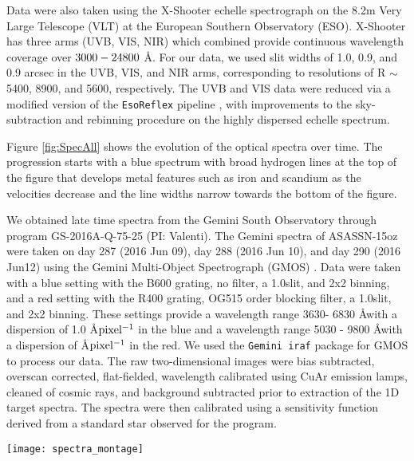 \documentclass[a4paper,fleqn,usenatbib]{mnras}
\begin{document}
Data were also taken using the X-Shooter echelle spectrograph \citep{2011vernet} on the 8.2m Very Large Telescope (VLT) at the European Southern Observatory (ESO).  
X-Shooter has three arms (UVB, VIS, NIR) which combined provide continuous wavelength coverage over $\rm{3000-24800}$ \AA. 
 For our data, we used slit widths of 1.0, 0.9, and 0.9 arcsec in the UVB, VIS, and NIR arms, corresponding to resolutions of R $\rm{\sim}$5400, 8900, and 5600, respectively. 
The UVB and VIS data were reduced via a modified version of the {\tt EsoReflex} pipeline \citep{2013freudling}, with improvements to the sky-subtraction and rebinning procedure on the highly dispersed echelle spectrum.

Figure \ref{fig:SpecAll} shows the evolution of the optical spectra over time.
The progression starts with a blue spectrum with broad hydrogen lines at the top of the figure that develops metal features such as iron and scandium as the velocities decrease and the line widths narrow towards the bottom of the figure. 

We obtained late time spectra from the Gemini South Observatory through program GS-2016A-Q-75-25 (PI: Valenti).  
The Gemini spectra of ASASSN-15oz were taken on day 287 (2016 Jun 09), day 288 (2016 Jun 10), and day 290 (2016 Jun12) using the Gemini Multi-Object Spectrograph (GMOS) \citep{2004hook}.  
Data were taken with a blue setting with the B600 grating, no filter, a 1.0\arcsec slit, and 2x2 binning, and a red setting with the R400 grating, OG515 order blocking filter, a 1.0\arcsec slit, and 2x2 binning.  
These settings provide a wavelength range 3630- 6830 \AA with a dispersion of 1.0 \AA $\rm{pixel^{-1}}$ in the blue and a wavelength range 5030 - 9800 \AA with a dispersion of \AA $\rm{pixel^{-1}}$ in the red.
We used the {\tt Gemini iraf} package for GMOS to process our data.  
The raw two-dimensional images were bias subtracted, overscan corrected, flat-fielded, wavelength calibrated using CuAr emission lamps, cleaned of cosmic rays, and background subtracted prior to extraction of the 1D target spectra.  
The spectra were then calibrated using a sensitivity function derived from a standard star observed for the program.
\begin{figure*}
\begin{center}
\texttt{[image: spectra\_montage]}
\caption{A time series of the photospheric spectra of ASASSN-15oz at rest wavelengths.
The phase of each spectrum is marked on the right.
Potential telluric contamination is marked with crossed circles above the day 24.5 spectrum. 
The first spectrum taken near maximum light shows hydrogen features (identified at the top of the figure).
At this early phase, the cachito feature (see Section \ref{sec:cachito}) is already visible. 
Over time the cachito feature fades while the hydrogen emission grows and metal lines become visible and grow in strength. 
These lines are identified in the bottom spectrum.}
\label{fig:SpecAll}
\end{center}
\end{figure*}
\end{document}
